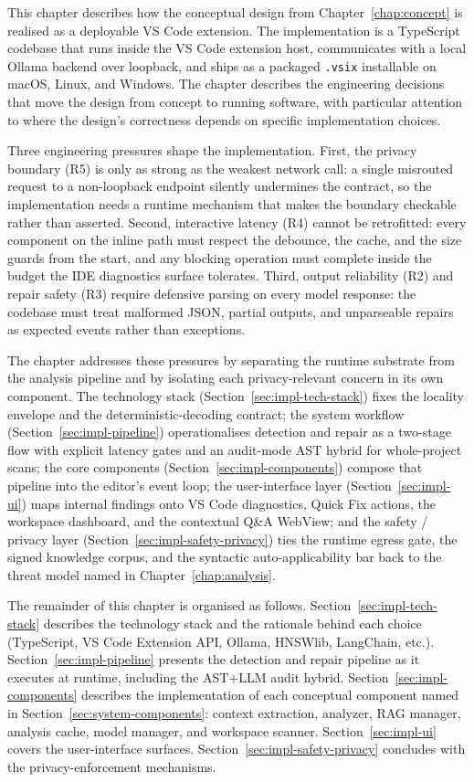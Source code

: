 This chapter describes how the conceptual design from Chapter~\ref{chap:concept} is realised as a deployable VS Code extension. The implementation is a TypeScript codebase that runs inside the VS Code extension host, communicates with a local Ollama backend over loopback, and ships as a packaged \texttt{.vsix} installable on macOS, Linux, and Windows. The chapter describes the engineering decisions that move the design from concept to running software, with particular attention to where the design's correctness depends on specific implementation choices.

Three engineering pressures shape the implementation. First, the privacy boundary (R5) is only as strong as the weakest network call: a single misrouted request to a non-loopback endpoint silently undermines the contract, so the implementation needs a runtime mechanism that makes the boundary checkable rather than asserted. Second, interactive latency (R4) cannot be retrofitted: every component on the inline path must respect the debounce, the cache, and the size guards from the start, and any blocking operation must complete inside the budget the IDE diagnostics surface tolerates. Third, output reliability (R2) and repair safety (R3) require defensive parsing on every model response: the codebase must treat malformed JSON, partial outputs, and unparseable repairs as expected events rather than exceptions.

The chapter addresses these pressures by separating the runtime substrate from the analysis pipeline and by isolating each privacy-relevant concern in its own component. The technology stack (Section~\ref{sec:impl-tech-stack}) fixes the locality envelope and the deterministic-decoding contract; the system workflow (Section~\ref{sec:impl-pipeline}) operationalises detection and repair as a two-stage flow with explicit latency gates and an audit-mode AST hybrid for whole-project scans; the core components (Section~\ref{sec:impl-components}) compose that pipeline into the editor's event loop; the user-interface layer (Section~\ref{sec:impl-ui}) maps internal findings onto VS Code diagnostics, Quick Fix actions, the workspace dashboard, and the contextual Q\&A WebView; and the safety / privacy layer (Section~\ref{sec:impl-safety-privacy}) ties the runtime egress gate, the signed knowledge corpus, and the syntactic auto-applicability bar back to the threat model named in Chapter~\ref{chap:analysis}.

The remainder of this chapter is organised as follows. Section~\ref{sec:impl-tech-stack} describes the technology stack and the rationale behind each choice (TypeScript, VS Code Extension API, Ollama, HNSWlib, LangChain, etc.). Section~\ref{sec:impl-pipeline} presents the detection and repair pipeline as it executes at runtime, including the AST+LLM audit hybrid. Section~\ref{sec:impl-components} describes the implementation of each conceptual component named in Section~\ref{sec:system-components}: context extraction, analyzer, RAG manager, analysis cache, model manager, and workspace scanner. Section~\ref{sec:impl-ui} covers the user-interface surfaces. Section~\ref{sec:impl-safety-privacy} concludes with the privacy-enforcement mechanisms.

